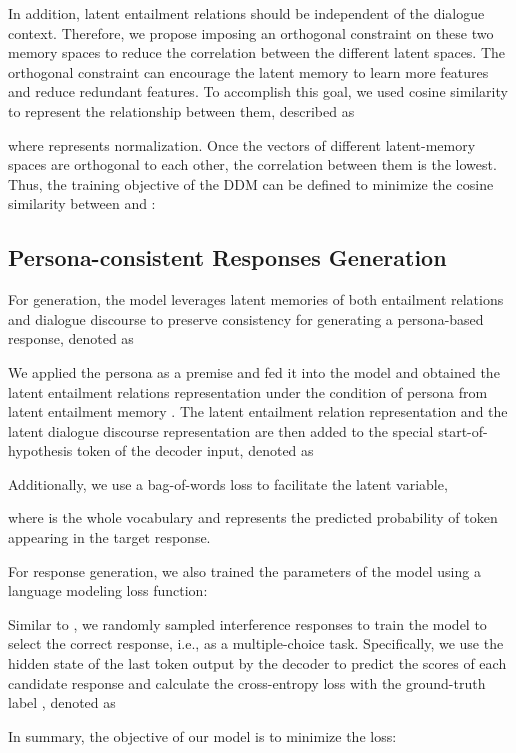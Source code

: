 \documentclass[letterpaper]{article} \usepackage{aaai23}  \usepackage{times}  \usepackage{helvet}  \usepackage{courier}  \usepackage[hyphens]{url}  \usepackage{graphicx} \urlstyle{rm} \def\UrlFont{\rm}  \usepackage{natbib}  \usepackage{caption} \frenchspacing  \setlength{\pdfpagewidth}{8.5in}  \setlength{\pdfpageheight}{11in}  \usepackage{algorithm}
\begin{document}
In addition, latent entailment relations should be independent of the dialogue context. Therefore, we propose imposing an orthogonal constraint on these two memory spaces to reduce the correlation between the different latent spaces. The orthogonal constraint can encourage the latent memory to learn more features and reduce redundant features. To accomplish this goal, we used cosine similarity to represent the relationship between them, described as

where  represents  normalization. Once the vectors of different latent-memory spaces are orthogonal to each other, the correlation between them is the lowest. Thus, the training objective of the DDM can be defined to minimize the cosine similarity between  and : 


\subsection{Persona-consistent Responses Generation}
For generation, the model leverages latent memories of both entailment relations and dialogue discourse to preserve consistency for generating a persona-based response, denoted as


We applied the persona as a premise and fed it into the model and obtained the latent entailment relations representation  under the condition of persona from latent entailment memory . The latent entailment relation representation  and the latent dialogue discourse representation  are then added to the special start-of-hypothesis token  of the decoder input, denoted as


Additionally, we use a bag-of-words loss \cite{Zhao2017} to facilitate the latent variable,

where  is the whole vocabulary and  represents the predicted probability of token   appearing in the target response.

For response generation, we also trained the parameters of the model using a language modeling loss function:


Similar to \cite{Wolf2019}, we randomly sampled  interference responses to train the model to select the correct response, i.e., as a multiple-choice task. Specifically, we use the hidden state of the last token output by the decoder to predict the scores  of each candidate response and calculate the cross-entropy loss with the ground-truth label , denoted as



In summary, the objective of our model is to minimize the loss:
\end{document}
